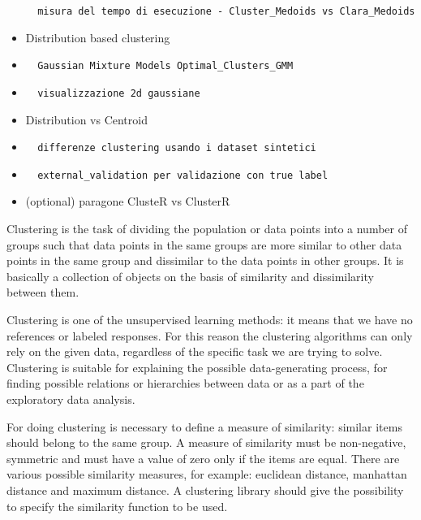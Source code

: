\documentclass[
]{article}
\begin{document}
\begin{itemize}
\begin{verbatim}
  misura del tempo di esecuzione - Cluster_Medoids vs Clara_Medoids
\end{verbatim}
\item
  Distribution based clustering
\item
\begin{verbatim}
  Gaussian Mixture Models Optimal_Clusters_GMM 
\end{verbatim}
\item
\begin{verbatim}
  visualizzazione 2d gaussiane
\end{verbatim}
\item
  Distribution vs Centroid
\item
\begin{verbatim}
  differenze clustering usando i dataset sintetici
\end{verbatim}
\item
\begin{verbatim}
  external_validation per validazione con true label 
\end{verbatim}
\item
  (optional) paragone ClusteR vs ClusterR
\end{itemize}

Clustering is the task of dividing the population or data points into a
number of groups such that data points in the same groups are more
similar to other data points in the same group and dissimilar to the
data points in other groups. It is basically a collection of objects on
the basis of similarity and dissimilarity between them.

Clustering is one of the unsupervised learning methods: it means that we
have no references or labeled responses. For this reason the clustering
algorithms can only rely on the given data, regardless of the specific
task we are trying to solve. Clustering is suitable for explaining the
possible data-generating process, for finding possible relations or
hierarchies between data or as a part of the exploratory data analysis.

For doing clustering is necessary to define a measure of similarity:
similar items should belong to the same group. A measure of similarity
must be non-negative, symmetric and must have a value of zero only if
the items are equal. There are various possible similarity measures, for
example: euclidean distance, manhattan distance and maximum distance. A
clustering library should give the possibility to specify the similarity
function to be used.
\end{document}
